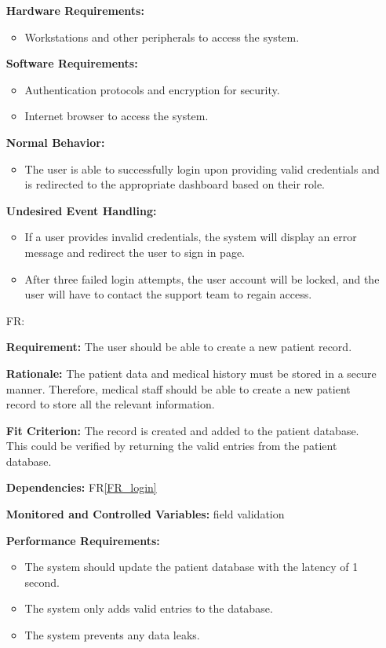 \documentclass[12pt]{article}
\newcounter{reqnum} %
\begin{document}
\begin{itemize}
  \textbf{Hardware Requirements:} 
  \begin{itemize}
    \item Workstations and other peripherals to access the system.
  \end{itemize}
  
  \textbf{Software Requirements:} 
  \begin{itemize}
    \item Authentication protocols and encryption for security. 
    \item Internet browser to access the system.
  \end{itemize}
  
  \textbf{Normal Behavior:} 
  \begin{itemize}
    \item The user is able to successfully login upon providing valid credentials and is redirected to the appropriate dashboard based on their role.
  \end{itemize}
  
  \textbf{Undesired Event Handling:}
  \begin{itemize}
    \item If a user provides invalid credentials, the system will display an error message and redirect the user to sign in page.
    \item After three failed login attempts, the user account will be locked, and the user will have to contact the support team to regain access.
  \end{itemize}
   
  
  \item[FR\refstepcounter{reqnum}\thereqnum \label{FR_createRecord}:]
  
  \textbf{Requirement:} The user should be able to create a new patient record. 
  
  \textbf{Rationale:} The patient data and medical history must be stored in a secure manner. Therefore, medical staff should be able to create a new patient record to store all the relevant information. 
  
  \textbf{Fit Criterion:} The record is created and added to the patient database. This could be verified by returning the valid entries from the patient database.
  
  \textbf{Dependencies:} FR\ref{FR_login}
  
  \textbf{Monitored and Controlled Variables:} field validation
  
  \textbf{Performance Requirements:} 
  \begin{itemize}
    \item The system should update the patient database with the latency of 1 second. 
    \item The system only adds valid entries to the database.
    \item The system prevents any data leaks.
  \end{itemize}
  

\end{itemize}
\end{document}
